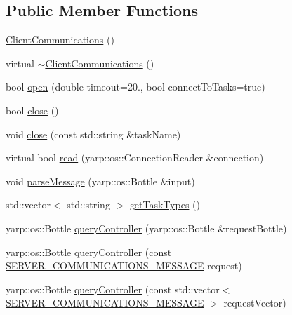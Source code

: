 \subsection*{Public Member Functions}
\begin{DoxyCompactItemize}
\item 
\hyperlink{classocra__recipes_1_1ClientCommunications_a459f2b8ffc37223b303ac0596cccdfd4}{Client\+Communications} ()
\item 
virtual \hyperlink{classocra__recipes_1_1ClientCommunications_a20df5cf496f895e9235ad38730962360}{$\sim$\+Client\+Communications} ()
\item 
bool \hyperlink{classocra__recipes_1_1ClientCommunications_a5ef6606831f855ae97815f4a34e1e1a1}{open} (double timeout=20., bool connect\+To\+Tasks=true)
\item 
bool \hyperlink{classocra__recipes_1_1ClientCommunications_a1ac6b0ebabc5fabdb2bf006ddc48c606}{close} ()
\item 
void \hyperlink{classocra__recipes_1_1ClientCommunications_ac96c7e76603600459e94b8fa1a0b213e}{close} (const std\+::string \&task\+Name)
\item 
virtual bool \hyperlink{classocra__recipes_1_1ClientCommunications_afbca8bd430e14a0b9a8254a29b78d202}{read} (yarp\+::os\+::\+Connection\+Reader \&connection)
\item 
void \hyperlink{classocra__recipes_1_1ClientCommunications_a452774799b5d8448a8ffd3ab5d24aa22}{parse\+Message} (yarp\+::os\+::\+Bottle \&input)
\item 
std\+::vector$<$ std\+::string $>$ \hyperlink{classocra__recipes_1_1ClientCommunications_a0a7b2eeaa35d925e63ba4568be1e4919}{get\+Task\+Types} ()
\item 
yarp\+::os\+::\+Bottle \hyperlink{classocra__recipes_1_1ClientCommunications_a555bf79c855b3c08402a5ba4d6f9410c}{query\+Controller} (yarp\+::os\+::\+Bottle \&request\+Bottle)
\item 
yarp\+::os\+::\+Bottle \hyperlink{classocra__recipes_1_1ClientCommunications_acd90f49ce7b275b83a73a75b9b355109}{query\+Controller} (const \hyperlink{namespaceocra__recipes_ae6246916f1927f7a201cc153ad76b07d}{S\+E\+R\+V\+E\+R\+\_\+\+C\+O\+M\+M\+U\+N\+I\+C\+A\+T\+I\+O\+N\+S\+\_\+\+M\+E\+S\+S\+A\+GE} request)
\item 
yarp\+::os\+::\+Bottle \hyperlink{classocra__recipes_1_1ClientCommunications_a12e293ab0cd846cf44f20a1fc61f82dc}{query\+Controller} (const std\+::vector$<$ \hyperlink{namespaceocra__recipes_ae6246916f1927f7a201cc153ad76b07d}{S\+E\+R\+V\+E\+R\+\_\+\+C\+O\+M\+M\+U\+N\+I\+C\+A\+T\+I\+O\+N\+S\+\_\+\+M\+E\+S\+S\+A\+GE} $>$ request\+Vector)

\end{DoxyCompactItemize}

